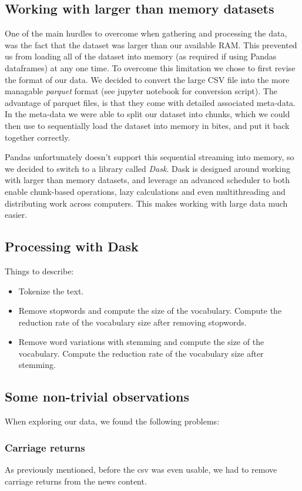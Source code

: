 \documentclass{article}
\begin{document}
\subsection{Working with larger than memory datasets}
One of the main hurdles to overcome when gathering and processing the data, was the fact that the dataset was larger
than our available RAM. This prevented us from loading all of the dataset into memory (as required if using Pandas
dataframes) at any one time. To overcome this limitation we chose to first revise the format of our data. We decided to
convert the large CSV file into the more managable \textit{parquet} format (see jupyter notebook for conversion script). The advantage of parquet files, is that they
come with detailed associated meta-data. In the meta-data we were able to split our dataset into chunks, which we could
then use to sequentially load the dataset into memory in bites, and put it back together correctly.

Pandas unfortunately doesn't support this sequential streaming into memory, so we decided to switch to a library called
\textit{Dask}. Dask is designed around working with larger than memory datasets, and leverage an advanced scheduler to both
enable chunk-based operations, lazy calculations and even multithreading and distributing work across computers. This makes working with large data much easier.
\subsection{Processing with Dask}
Things to describe:
\begin{itemize}
    \item Tokenize the text.
    \item Remove stopwords and compute the size of the vocabulary. Compute the reduction rate of the vocabulary size after removing stopwords.
    \item Remove word variations with stemming and compute the size of the vocabulary. Compute the reduction rate of the vocabulary size after stemming.
\end{itemize}
    
    
    

\subsection{Some non-trivial observations}
When exploring our data, we found the following problems:
\subsubsection{Carriage returns}
As previously mentioned, before the csv was even usable, we had to remove carriage returns from the news content.
\end{document}
